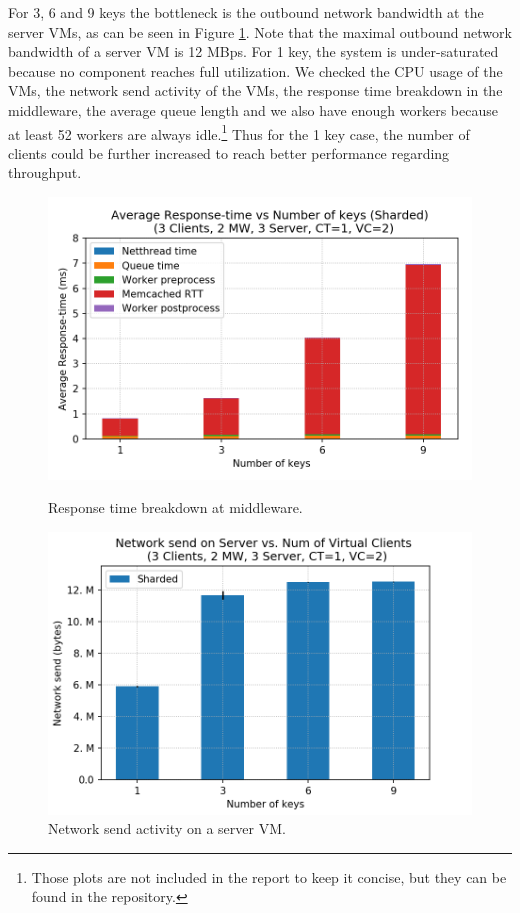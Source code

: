 For 3, 6 and 9 keys the bottleneck is the outbound network bandwidth at the server VMs, as can be seen in Figure \ref{sharded_netsend_server}. Note that the maximal outbound network bandwidth of a server VM is 12 MBps.
For 1 key, the system is under-saturated because no component reaches full utilization. We checked the CPU usage of the VMs, the network send activity of the VMs, the response time breakdown in the middleware, the average queue length and we also have enough workers because at least 52 workers are always idle.\footnote{Those plots are not included in the report to keep it concise, but they can be found in the repository.} Thus for the 1 key case, the number of clients could be further increased to reach better performance regarding throughput.

\begin{figure}[H]
   \begin{minipage}{0.48\textwidth}
    \centering
	\includegraphics[scale=0.48]{figures/4_GetsAndMultigets/rt_breakdown_sharded_2018-11-22_18h12.png}
	\caption{Response time breakdown at middleware.}
	\label{rt_breakdown_sharded}
   \end{minipage}\hfill
   \begin{minipage}{0.48\textwidth}
     \centering
     \includegraphics[width=1\linewidth]{figures/4_GetsAndMultigets/dstat_server_netsend_sharded_True_2018-11-22_18h12.png}
     \caption{Network send activity on a server VM.}\label{sharded_netsend_server}
   \end{minipage}
\end{figure}
